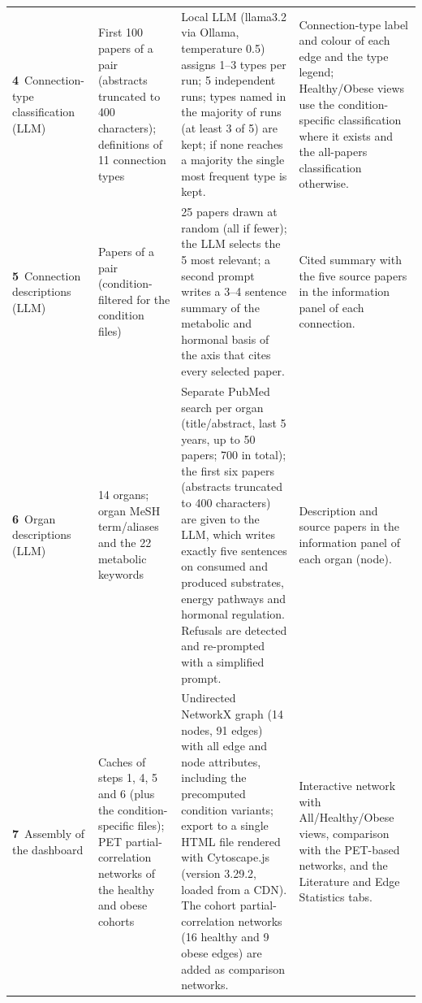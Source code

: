 \begin{longtable}{@{}L{2.3cm} L{3.2cm} L{5.9cm} L{4.4cm}@{}}
\textbf{4}~Connection-type classification (LLM)
 & First 100 papers of a pair (abstracts truncated to 400 characters); definitions of 11 connection types
 & Local LLM (llama3.2 via Ollama, temperature 0.5) assigns 1--3 types per run; 5 independent runs;
   types named in the majority of runs (at least 3 of 5) are kept; if none reaches a majority the single
   most frequent type is kept.
 & Connection-type label and colour of each edge and the type legend; Healthy/Obese views use the
   condition-specific classification where it exists and the all-papers classification otherwise.\\[3pt]

\textbf{5}~Connection descriptions (LLM)
 & Papers of a pair (condition-filtered for the condition files)
 & 25 papers drawn at random (all if fewer); the LLM selects the 5 most relevant; a second prompt writes a
   3--4 sentence summary of the metabolic and hormonal basis of the axis that cites every selected paper.
 & Cited summary with the five source papers in the information panel of each connection.\\[3pt]

\textbf{6}~Organ descriptions (LLM)
 & 14 organs; organ MeSH term/aliases and the 22 metabolic keywords
 & Separate PubMed search per organ (title/abstract, last 5 years, up to 50 papers; 700 in total); the first six
   papers (abstracts truncated to 400 characters) are given to the LLM, which writes exactly five sentences on
   consumed and produced substrates, energy pathways and hormonal regulation. Refusals are detected and
   re-prompted with a simplified prompt.
 & Description and source papers in the information panel of each organ (node).\\[3pt]

\textbf{7}~Assembly of the dashboard
 & Caches of steps 1, 4, 5 and 6 (plus the condition-specific files); PET partial-correlation networks
   of the healthy and obese cohorts
 & Undirected NetworkX graph (14 nodes, 91 edges) with all edge and node attributes, including the
   precomputed condition variants; export to a single HTML file rendered with Cytoscape.js (version 3.29.2,
   loaded from a CDN). The cohort partial-correlation networks (16 healthy and 9 obese edges) are added
   as comparison networks.
 & Interactive network with All/Healthy/Obese views, comparison with the PET-based networks, and the
   Literature and Edge Statistics tabs.\\

\end{longtable}

